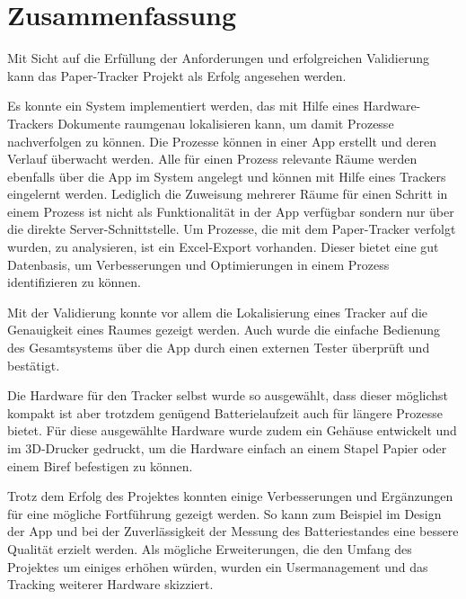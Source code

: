 \chapter{Zusammenfassung}

Mit Sicht auf die Erfüllung der Anforderungen und erfolgreichen Validierung kann das Paper-Tracker Projekt als
Erfolg angesehen werden.

Es konnte ein System implementiert werden, das mit Hilfe eines Hardware-Trackers Dokumente
raumgenau lokalisieren kann, um damit Prozesse nachverfolgen zu können.
Die Prozesse können in einer App erstellt und deren Verlauf überwacht werden.
Alle für einen Prozess relevante Räume werden ebenfalls über die App im System angelegt und können mit Hilfe eines
Trackers eingelernt werden.
Lediglich die Zuweisung mehrerer Räume für einen Schritt in einem Prozess ist nicht als Funktionalität in der App
verfügbar sondern nur über die direkte Server-Schnittstelle.
Um Prozesse, die mit dem Paper-Tracker verfolgt wurden, zu analysieren, ist ein Excel-Export vorhanden.
Dieser bietet eine gut Datenbasis, um Verbesserungen und Optimierungen in einem Prozess identifizieren zu können.

Mit der Validierung konnte vor allem die Lokalisierung eines Tracker auf die Genauigkeit eines Raumes gezeigt werden.
Auch wurde die einfache Bedienung des Gesamtsystems über die App durch einen externen Tester überprüft und bestätigt.

Die Hardware für den Tracker selbst wurde so ausgewählt, dass dieser möglichst kompakt ist aber trotzdem genügend
Batterielaufzeit auch für längere Prozesse bietet.
Für diese ausgewählte Hardware wurde zudem ein Gehäuse entwickelt und im 3D-Drucker gedruckt, um die Hardware
einfach an einem Stapel Papier oder einem Biref befestigen zu können.

Trotz dem Erfolg des Projektes konnten einige Verbesserungen und Ergänzungen für eine mögliche Fortführung gezeigt werden.
So kann zum Beispiel im Design der App und bei der Zuverlässigkeit der Messung des Batteriestandes eine bessere Qualität erzielt werden.
Als mögliche Erweiterungen, die den Umfang des Projektes um einiges erhöhen würden, wurden ein Usermanagement und das Tracking weiterer Hardware skizziert.
